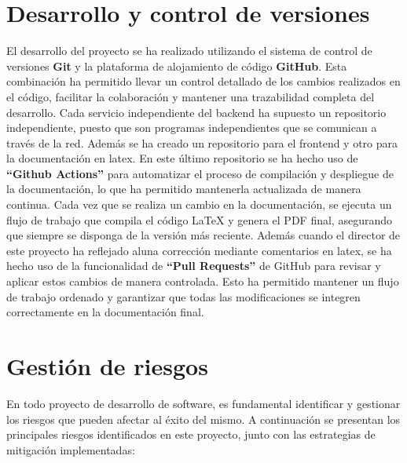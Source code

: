 \section{Desarrollo y control de versiones}

El desarrollo del proyecto se ha realizado utilizando el sistema de control de versiones \textbf{Git} y la plataforma de alojamiento de código \textbf{GitHub}. Esta combinación ha permitido llevar un control detallado de los cambios realizados en el código, facilitar la colaboración y mantener una trazabilidad completa del desarrollo.
\newline\newline
Cada servicio independiente del backend ha supuesto un repositorio independiente, puesto que son programas independientes que se comunican a través de la red. Además se ha creado un repositorio para el frontend y otro para la documentación en latex.
\newline\newline
En este último repositorio se ha hecho uso de \textbf{``Github Actions''} para automatizar el proceso de compilación y despliegue de la documentación, lo que ha permitido mantenerla actualizada de manera continua. Cada vez que se realiza un cambio en la documentación, se ejecuta un flujo de trabajo que compila el código LaTeX y genera el PDF final, asegurando que siempre se disponga de la versión más reciente.
\newline
Además cuando el director de este proyecto ha reflejado aluna corrección mediante comentarios en latex, se ha hecho uso de la funcionalidad de \textbf{``Pull Requests''} de GitHub para revisar y aplicar estos cambios de manera controlada. Esto ha permitido mantener un flujo de trabajo ordenado y garantizar que todas las modificaciones se integren correctamente en la documentación final.

\section{Gestión de riesgos}

En todo proyecto de desarrollo de software, es fundamental identificar y gestionar los riesgos que pueden afectar al éxito del mismo. A continuación se presentan los principales riesgos identificados en este proyecto, junto con las estrategias de mitigación implementadas:

